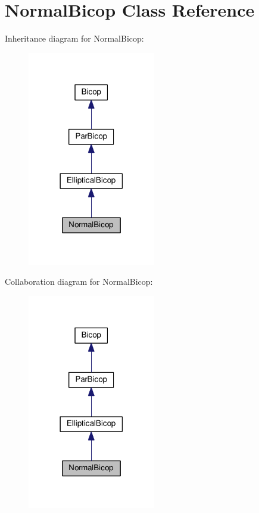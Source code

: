 \hypertarget{class_normal_bicop}{\section{Normal\+Bicop Class Reference}
\label{class_normal_bicop}
}


Inheritance diagram for Normal\+Bicop\+:
\nopagebreak
\begin{figure}[H]
\begin{center}
\leavevmode
\includegraphics[width=158pt]{class_normal_bicop__inherit__graph}
\end{center}
\end{figure}


Collaboration diagram for Normal\+Bicop\+:
\nopagebreak
\begin{figure}[H]
\begin{center}
\leavevmode
\includegraphics[width=158pt]{class_normal_bicop__coll__graph}
\end{center}
\end{figure}
